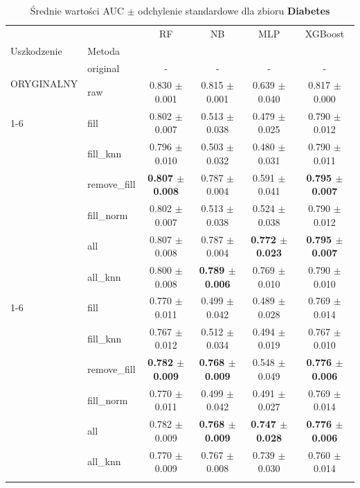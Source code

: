 \begin{table}[htbp]
\caption{Średnie wartości AUC $\pm$ odchylenie standardowe dla zbioru \textbf{Diabetes}}
\label{tab:wyniki_diabetes}
\begin{tabular}{llcccc}
\toprule
 &  & RF & NB & MLP & XGBoost \\
Uszkodzenie & Metoda &  &  &  &  \\
\midrule
\multirow[t]{2}{*}{ORYGINALNY} & original & - & - & - & - \\
 & raw & 0.830 $\pm$ 0.001 & 0.815 $\pm$ 0.001 & 0.639 $\pm$ 0.040 & 0.817 $\pm$ 0.000 \\
\cline{1-6}
\multirow[t]{7}{*}{10%
 & fill & 0.802 $\pm$ 0.007 & 0.513 $\pm$ 0.038 & 0.479 $\pm$ 0.025 & 0.790 $\pm$ 0.012 \\
 & fill_knn & 0.796 $\pm$ 0.010 & 0.503 $\pm$ 0.032 & 0.480 $\pm$ 0.031 & 0.790 $\pm$ 0.011 \\
 & remove_fill & \textbf{0.807 $\pm$ 0.008} & 0.787 $\pm$ 0.004 & 0.591 $\pm$ 0.041 & \textbf{0.795 $\pm$ 0.007} \\
 & fill_norm & 0.802 $\pm$ 0.007 & 0.513 $\pm$ 0.038 & 0.524 $\pm$ 0.038 & 0.790 $\pm$ 0.012 \\
 & all & 0.807 $\pm$ 0.008 & 0.787 $\pm$ 0.004 & \textbf{0.772 $\pm$ 0.023} & \textbf{0.795 $\pm$ 0.007} \\
 & all_knn & 0.800 $\pm$ 0.008 & \textbf{0.789 $\pm$ 0.006} & 0.769 $\pm$ 0.010 & 0.790 $\pm$ 0.010 \\
\cline{1-6}
\multirow[t]{7}{*}{20%
 & fill & 0.770 $\pm$ 0.011 & 0.499 $\pm$ 0.042 & 0.489 $\pm$ 0.028 & 0.769 $\pm$ 0.014 \\
 & fill_knn & 0.767 $\pm$ 0.012 & 0.512 $\pm$ 0.034 & 0.494 $\pm$ 0.019 & 0.767 $\pm$ 0.010 \\
 & remove_fill & \textbf{0.782 $\pm$ 0.009} & \textbf{0.768 $\pm$ 0.009} & 0.548 $\pm$ 0.049 & \textbf{0.776 $\pm$ 0.006} \\
 & fill_norm & 0.770 $\pm$ 0.011 & 0.499 $\pm$ 0.042 & 0.491 $\pm$ 0.027 & 0.769 $\pm$ 0.014 \\
 & all & 0.782 $\pm$ 0.009 & \textbf{0.768 $\pm$ 0.009} & \textbf{0.747 $\pm$ 0.028} & \textbf{0.776 $\pm$ 0.006} \\
 & all_knn & 0.770 $\pm$ 0.009 & 0.767 $\pm$ 0.008 & 0.739 $\pm$ 0.030 & 0.760 $\pm$ 0.014 \\
}}
\end{tabular}
\end{table}
